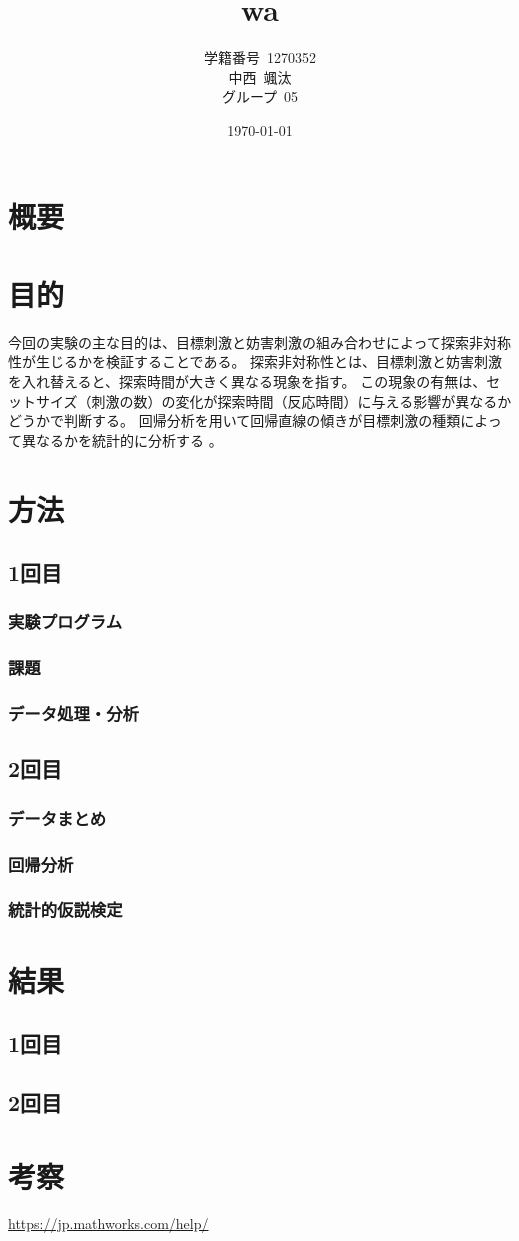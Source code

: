 \documentclass{jlreq}
\title{wa}
\author{学籍番号~1270352\\
        中西~颯汰\\
        グループ~05\\
        }
\date{\today}
\begin{document}
\maketitle
\clearpage
\tableofcontents
\clearpage
\section{概要}
\section{目的}
今回の実験の主な目的は、目標刺激と妨害刺激の組み合わせによって探索非対称性が生じるかを検証することである。
探索非対称性とは、目標刺激と妨害刺激を入れ替えると、探索時間が大きく異なる現象を指す。
この現象の有無は、セットサイズ（刺激の数）の変化が探索時間（反応時間）に与える影響が異なるかどうかで判断する。
回帰分析を用いて回帰直線の傾きが目標刺激の種類によって異なるかを統計的に分析する 。
\section{方法}
\subsection{1回目}
\subsubsection*{実験プログラム}
\subsubsection*{課題}
\subsubsection*{データ処理・分析}

\subsection{2回目}
\subsubsection*{データまとめ}
\subsubsection*{回帰分析}
\subsubsection*{統計的仮説検定}

\section{結果}
\subsection{1回目}
\subsection{2回目}
\section{考察}
\begin{thebibliography}{9}

\url{https://jp.mathworks.com/help/}
\end{thebibliography}
\end{document}
